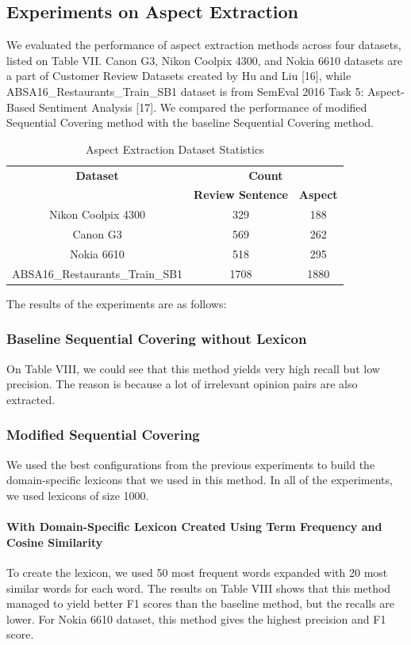 \documentclass[a4paper,conference]{IEEEtran}
\begin{document}
\subsection{Experiments on Aspect Extraction}
We evaluated the performance of aspect extraction methods across four datasets, listed on Table VII. Canon G3, Nikon Coolpix 4300, and Nokia 6610 datasets are a part of Customer Review Datasets created by Hu and Liu [16], while ABSA16\_Restaurants\_Train\_SB1 dataset is from SemEval 2016 Task 5: Aspect-Based Sentiment Analysis [17]. We compared the performance of modified Sequential Covering method with the baseline Sequential Covering method.

\begin{table}[htbp]
\caption{Aspect Extraction Dataset Statistics}
\begin{center}
\begin{tabular}{|c|c|c|}
\hline
\textbf{Dataset} & \multicolumn{2}{|c|}{\textbf{Count}}\\
\cline{2-3}
&\textbf{Review Sentence} & \textbf{Aspect}\\
\hline
Nikon Coolpix 4300&329&188 \\
\hline
Canon G3&569&262 \\
\hline
Nokia 6610&518&295\\
\hline
ABSA16\_Restaurants\_Train\_SB1&1708&1880 \\
\hline
\end{tabular}
\label{tab1}
\end{center}
\end{table}

The results of the experiments are as follows:
\subsubsection{Baseline Sequential Covering without Lexicon}
On Table VIII, we could see that this method yields very high recall but low precision. The reason is because a lot of irrelevant opinion pairs are also extracted.
\subsubsection{Modified Sequential Covering}
We used the best configurations from the previous experiments to build the domain-specific lexicons that we used in this method. In all of the experiments, we used lexicons of size 1000.
\paragraph{With Domain-Specific Lexicon Created Using Term Frequency and Cosine Similarity}
To create the lexicon, we used 50 most frequent words expanded with 20 most similar words for each word. The results on Table VIII shows that this method managed to yield better F1 scores than the baseline method, but the recalls are lower. For Nokia 6610 dataset, this method gives the highest precision and F1 score.
\end{document}
